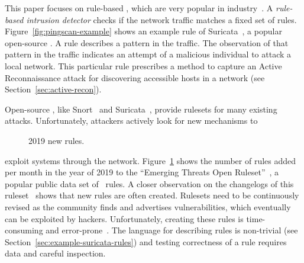 \documentclass[conference]{IEEEtran}
\begin{document}
This paper focuses on rule-based \nids{}, which are very popular in
industry~\cite{proofpoint-etpro,snort-rule-subscriptions}. A
\emph{rule-based intrusion detector} checks if the network traffic matches a fixed
set of rules. Figure~\ref{fig:pingscan-example} shows an example rule
of Suricata~\cite{suricata}, a popular open-source \nids{}. A rule
describes a pattern in the traffic. The observation of that pattern in
the traffic indicates an attempt of a malicious individual
to attack a local network. This particular rule prescribes a method to
capture an Active Reconnaissance attack for discovering accessible
hosts in a network (see Section~\ref{sec:active-recon}).

Open-source \nids{}, like Snort~\cite{snort} and
Suricata~\cite{suricata}, provide rulesets for many existing
attacks. Unfortunately, attackers actively look for new mechanisms to

\begin{figure}
    \vspace{-2ex}  
    \centering
    \vspace{-5ex}
    \caption{\label{fig:distribution-rules-per-month}2019 new rules.}
\end{figure}
exploit systems through the
network. Figure~\ref{fig:distribution-rules-per-month} shows the
number of rules added per month in the year of 2019 to the ``Emerging
Threats Open Ruleset''~\cite{emerging-threats-open}, a popular public
data set of \suri\ rules. A closer observation on the changelogs of
this ruleset~\cite{emerging-threats-changelogs} shows that new rules
are often created.  Rulesets need to be continuously revised as the
community finds and advertises vulnerabilities, which eventually can
be exploited by hackers.  Unfortunately, creating these rules is
time-consuming and error-prone~\cite{vollmer-etal-cics2011,alparslan-blog-suri}. The language for
describing rules is non-trivial (see
Section~\ref{sec:example-suricata-rules}) and testing correctness of a
rule requires data and careful inspection.
\end{document}
